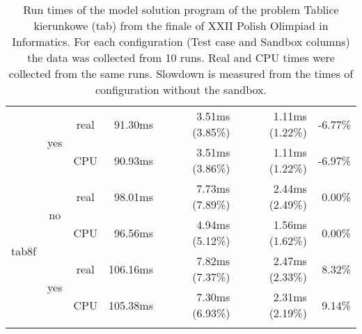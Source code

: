 \documentclass[en]{pracamgr}
\begin{document}
\begin{appendices}
\begin{small}
\begin{longtable}{|l|c|c|r|r|r|r|}
                          \cline{2-7}
                          & \multirow{2}{*}{yes} & real & 91.30ms & 3.51ms (3.85\%) & 1.11ms (1.22\%) & -6.77\% \\*
                          &                      & CPU  & 90.93ms & 3.51ms (3.86\%) & 1.11ms (1.22\%) & -6.97\% \\
\hline
\multirow{4}{*}{tab8f}    & \multirow{2}{*}{no}  & real & 98.01ms & 7.73ms (7.89\%) & 2.44ms (2.49\%) & 0.00\% \\*
                          &                      & CPU  & 96.56ms & 4.94ms (5.12\%) & 1.56ms (1.62\%) & 0.00\% \\*
                          \cline{2-7}
                          & \multirow{2}{*}{yes} & real & 106.16ms & 7.82ms (7.37\%) & 2.47ms (2.33\%) & 8.32\% \\*
                          &                      & CPU  & 105.38ms & 7.30ms (6.93\%) & 2.31ms (2.19\%) & 9.14\% \\
\hline
\caption{Run times of the model solution program of the problem Tablice kierunkowe (tab) from the finale of XXII Polish Olimpiad in Informatics. For each configuration (Test case and Sandbox columns) the data was collected from 10 runs. Real and CPU times were collected from the same runs. Slowdown is measured from the times of configuration without the sandbox.}
\label{table:tab_model_solution_runtimes}
\end{longtable}
\end{small}


\end{appendices}
\end{document}
